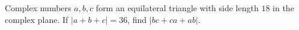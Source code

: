 Complex numbers $a,b,c$ form an equilateral triangle with side length $18$ in the complex plane. If $\left|a+b+c\right|=36$, find $\left|bc+ca+ab\right|$.